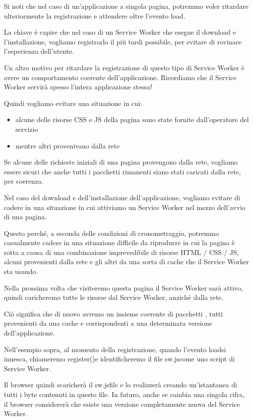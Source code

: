 \documentclass[italian]{article}
\begin{document}
Si noti che nel caso di un'applicazione a singola pagina, potremmo voler ritardare ulteriormente la registrazione e attendere oltre l'evento load.

La chiave è capire che nel caso di un Service Worker che esegue il download e l'installazione, vogliamo registrarlo il più tardi possibile, per evitare di rovinare l'esperienza dell'utente.

Un altro motivo per ritardare la registrazione di questo tipo di Service Worker è avere un comportamento coerente dell'applicazione. Ricordiamo che il Service Worker servirà spesso l'intera applicazione stessa!

Quindi vogliamo evitare una situazione in cui:
\begin{itemize}
\item alcune delle risorse CSS e JS della pagina sono state fornite dall'operatore del servizio
\item mentre altri provenivano dalla rete
\end{itemize}
Se alcune delle richieste iniziali di una pagina provengono dalla rete, vogliamo essere sicuri che anche tutti i pacchetti rimanenti siano stati caricati dalla rete, per coerenza.

Nel caso del download e dell'installazione dell'applicazione, vogliamo evitare di cadere in una situazione in cui attiviamo un Service Worker nel mezzo dell'avvio di una pagina.

Questo perché, a seconda delle condizioni di cronometraggio, potremmo casualmente cadere in una situazione difficile da riprodurre in cui la pagina è rotta a causa di una combinazione imprevedibile di risorse HTML / CSS / JS, alcuni provenienti dalla rete e gli altri da una sorta di cache che il Service Worker sta usando.

Nella prossima volta che visiteremo questa pagina il Service Worker sarà attivo, quindi caricheremo tutte le risorse dal Service Worker, anziché dalla rete.

Ciò significa che di nuovo avremo un insieme coerente di pacchetti , tutti provenienti da una cache e corrispondenti a una determinata versione dell'applicazione.

Nell'esempio sopra, al momento della registrazione, quando l'evento loadsi innesca, chiameremo register()e identificheremo il file sw.jscome uno script di Service Worker.

Il browser quindi scaricherà il sw.jsfile e lo realizzerà creando un'istantanea di tutti i byte contenuti in questo file. In futuro, anche se cambia una singola cifra, il browser considererà che esiste una versione completamente nuova del Service Worker.
\end{document}
